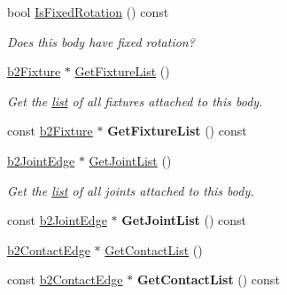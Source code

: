 \begin{DoxyCompactItemize}
\mbox{\label{classb2Body_a0920b7a770f7c876cf6d149e227036b5}} 
bool \hyperlink{classb2Body_a0920b7a770f7c876cf6d149e227036b5}{Is\+Fixed\+Rotation} () const
\begin{DoxyCompactList}\small\item\em Does this body have fixed rotation? \end{DoxyCompactList}\item 
\mbox{\label{classb2Body_a8a132608746291f2137f093c62d84992}} 
\hyperlink{classb2Fixture}{b2\+Fixture} $\ast$ \hyperlink{classb2Body_a8a132608746291f2137f093c62d84992}{Get\+Fixture\+List} ()
\begin{DoxyCompactList}\small\item\em Get the \hyperlink{protocollist-p}{list} of all fixtures attached to this body. \end{DoxyCompactList}\item 
\mbox{\label{classb2Body_a7472979d6cb440b0b02e251cdb9b5257}} 
const \hyperlink{classb2Fixture}{b2\+Fixture} $\ast$ {\bfseries Get\+Fixture\+List} () const
\item 
\mbox{\label{classb2Body_a1716a7b90039536a6a636d0011079fd2}} 
\hyperlink{structb2JointEdge}{b2\+Joint\+Edge} $\ast$ \hyperlink{classb2Body_a1716a7b90039536a6a636d0011079fd2}{Get\+Joint\+List} ()
\begin{DoxyCompactList}\small\item\em Get the \hyperlink{protocollist-p}{list} of all joints attached to this body. \end{DoxyCompactList}\item 
\mbox{\label{classb2Body_ad199b1c8c28e129afdd4a2975e9f9677}} 
const \hyperlink{structb2JointEdge}{b2\+Joint\+Edge} $\ast$ {\bfseries Get\+Joint\+List} () const
\item 
\hyperlink{structb2ContactEdge}{b2\+Contact\+Edge} $\ast$ \hyperlink{classb2Body_af0f564c41cd66f1a2f3910e83bf58d61}{Get\+Contact\+List} ()
\item 
\mbox{\label{classb2Body_a74190d96a35a86d3f23dc1196fa2b11a}} 
const \hyperlink{structb2ContactEdge}{b2\+Contact\+Edge} $\ast$ {\bfseries Get\+Contact\+List} () const
\item 
\mbox{\label{classb2Body_ad6ce9d4ac8eacea074f3198393a5d508}} 

\end{DoxyCompactItemize}
